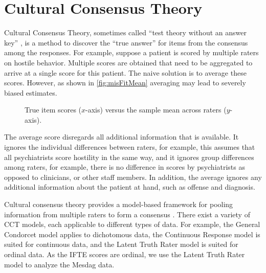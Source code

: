 \documentclass[a4paper,11pt]{article}
\begin{document}
\section{Cultural Consensus Theory}

Cultural Consensus Theory, sometimes called ``test theory without an answer key'' \parencite{batchelder1988test}, is a method to discover the ``true answer'' for items from the consensus among the responses.
For example, suppose a patient is scored by multiple raters on hostile behavior.
Multiple scores are obtained that need to be aggregated to arrive at a single score for this patient.
The naive solution is to average these scores.
However, as shown in \autoref{fig:misFitMean} averaging may lead to severely biased estimates.
\begin{figure}[!ht]
	\centering
	
	\caption{True item scores ($x$-axis) versus the sample mean across raters ($y$-axis).}
	\label{fig:misFitMean}
\end{figure}
The average score disregards all additional information that is available.
It ignores the individual differences between raters, for example, this assumes that all psychiatrists score hostility in the same way, and it ignores group differences among raters, for example, there is no difference in scores by psychiatrists as opposed to clinicians, or other staff members.
In addition, the average ignores any additional information about the patient at hand, such as offense and diagnosis.

Cultural consensus theory provides a model-based framework for pooling information from multiple raters to form a consensus \parencite{anders2014cultural}.
There exist a variety of CCT models, each applicable to different types of data.
For example, the General Condorcet model \parencite{Batchelder1986statistical} applies to dichotomous data, the Continuous Response model \parencite{anders2014cultural} is suited for continuous data, and the Latent Truth Rater model \parencite{Anders2015cultural} is suited for ordinal data.
As the IFTE scores are ordinal, we use the Latent Truth Rater model to analyze the Mesdag data.
\end{document}
